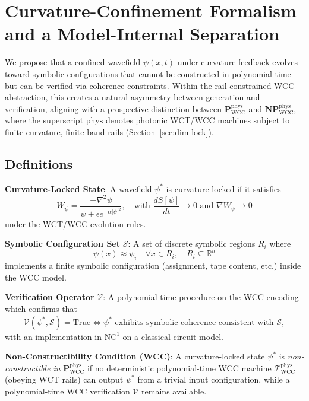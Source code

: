 \documentclass[12pt]{article}
\theoremstyle{remark}
\begin{document}
\section{Curvature-Confinement Formalism and a Model-Internal Separation}

We propose that a confined wavefield $\psi(x, t)$ under curvature feedback
evolves toward symbolic configurations that cannot be constructed in
polynomial time but can be verified via coherence constraints. Within the
rail-constrained WCC abstraction, this creates a natural asymmetry between
generation and verification, aligning with a prospective distinction between
$\mathbf{P}_{\mathrm{WCC}}^{\mathrm{phys}}$ and
$\mathbf{NP}_{\mathrm{WCC}}^{\mathrm{phys}}$, where the superscript
$\mathrm{phys}$ denotes photonic WCT/WCC machines subject to finite-curvature,
finite-band rails (Section~\ref{sec:dim-lock}).

\subsection{Definitions}

\textbf{Curvature-Locked State}: A wavefield $\psi^*$ is curvature-locked if
it satisfies
\begin{equation}
W_\psi = \frac{-\nabla^2 \psi}{\psi + \epsilon e^{-\alpha |\psi|^2}},
\quad \text{with } \frac{dS[\psi]}{dt} \to 0 \text{ and } \nabla W_\psi \to 0
\end{equation}
under the WCT/WCC evolution rules.

\textbf{Symbolic Configuration Set} $\mathcal{S}$: A set of discrete
symbolic regions $R_i$ where
\[
\psi(x) \approx \psi_i \quad \forall x \in R_i, \quad R_i \subseteq \mathbb{R}^n
\]
implements a finite symbolic configuration (assignment, tape content, etc.)
inside the WCC model.

\textbf{Verification Operator} $\mathcal{V}$: A polynomial-time procedure on
the WCC encoding which confirms that
\[
\mathcal{V}(\psi^*, \mathcal{S}) = \text{True} \iff
\psi^* \text{ exhibits symbolic coherence consistent with } \mathcal{S},
\]
with an implementation in $\mathrm{NC}^1$ on a classical circuit model.

\textbf{Non-Constructibility Condition (WCC)}: A curvature-locked state
$\psi^*$ is \emph{non-constructible in}
$\mathbf{P}_{\mathrm{WCC}}^{\mathrm{phys}}$ if no deterministic
polynomial-time WCC machine
$\mathcal{T}_{\mathrm{WCC}}^{\mathrm{phys}}$ (obeying WCT rails) can output
$\psi^*$ from a trivial input configuration, while a polynomial-time WCC
verification $\mathcal{V}$ remains available.
\end{document}
